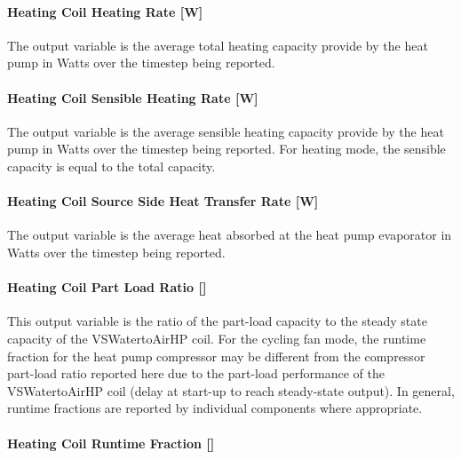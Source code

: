 \paragraph{Heating Coil Heating Rate {[}W{]}}\label{heating-coil-heating-rate-w-4}

The output variable is the average total heating capacity provide by the heat pump in Watts over the timestep being reported.

\paragraph{Heating Coil Sensible Heating Rate {[}W{]}}\label{heating-coil-sensible-heating-rate-w-2}

The output variable is the average sensible heating capacity provide by the heat pump in Watts over the timestep being reported. For heating mode, the sensible capacity is equal to the total capacity.

\paragraph{Heating Coil Source Side Heat Transfer Rate {[}W{]}}\label{heating-coil-source-side-heat-transfer-rate-w-2}

The output variable is the average heat absorbed at the heat pump evaporator in Watts over the timestep being reported.

\paragraph{\texorpdfstring{Heating Coil Part Load Ratio {[]}}{Heating Coil Part Load Ratio }}\label{heating-coil-part-load-ratio-2}

This output variable is the ratio of the part-load capacity to the steady state capacity of the VSWatertoAirHP coil. For the cycling fan mode, the runtime fraction for the heat pump compressor may be different from the compressor part-load ratio reported here due to the part-load performance of the VSWatertoAirHP coil (delay at start-up to reach steady-state output). In general, runtime fractions are reported by individual components where appropriate.

\paragraph{\texorpdfstring{Heating Coil Runtime Fraction {[]}}{Heating Coil Runtime Fraction }}\label{heating-coil-runtime-fraction-8}

